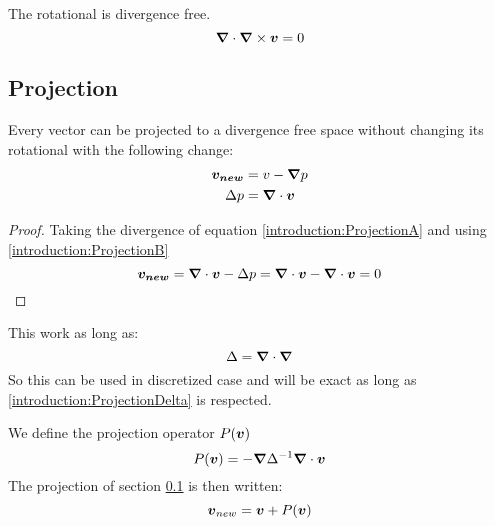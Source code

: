 \begin{property}
The rotational is divergence free.
 \begin{equation}
  {\boldsymbol {\nabla}}\cdot {\boldsymbol {\nabla}} \times {\boldsymbol {v}}=0
 \end{equation}
\end{property}

\subsection{Projection}
\label{introduction:projection}
\begin{property}
 Every vector can be projected to a divergence free space without changing its rotational with the following change:
\begin{align}
 {\boldsymbol {v_{new}}}&=v-{\boldsymbol {\nabla}}p \label{introduction:ProjectionA}\\
 \Delta p&={\boldsymbol {\nabla}} \cdot {\boldsymbol {v}} \label{introduction:ProjectionB}
\end{align}
\end{property}
\begin{proof}
  Taking the divergence of equation \ref{introduction:ProjectionA} and using \ref{introduction:ProjectionB}
  \begin{equation}
   {\boldsymbol {v_{new}}}={\boldsymbol {\nabla}}\cdot{\boldsymbol {v}}-\Delta p={\boldsymbol {\nabla}}\cdot{\boldsymbol {v}}-{\boldsymbol {\nabla}}\cdot{\boldsymbol {v}}=0
  \end{equation}
  \end{proof}
  
  \begin{remark}
 This work as long as:
 \begin{equation}
  \Delta={\boldsymbol {\nabla}}\cdot {\boldsymbol {\nabla}}\label{introduction:ProjectionDelta}
 \end{equation}
 So this can be used in discretized case and will be exact as long as \ref{introduction:ProjectionDelta} is respected.
 \end{remark}


\begin{definition}
\label{introduction:projectiondef}
We define the projection operator $P({\boldsymbol {v}})$
  \begin{equation}
    P({\boldsymbol {v}})=-{\boldsymbol {\nabla}}\Delta^{-1}{\boldsymbol {\nabla}}\cdot {\boldsymbol {v}}
  \end{equation}
  The projection of section \ref{introduction:projection} is then written:
  \begin{equation}
    {\boldsymbol {v}}_{new}={\boldsymbol {v}}+P({\boldsymbol {v}})
  \end{equation}
\end{definition}

